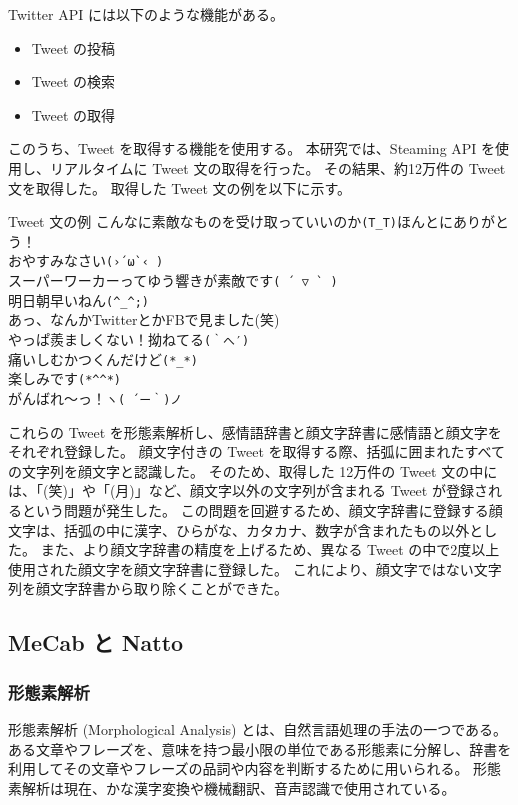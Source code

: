 \documentclass[11pt,a4j]{jsarticle}
\begin{document}
Twitter API には以下のような機能がある。

\begin{itemize}
  \item Tweet の投稿
  \item Tweet の検索
  \item Tweet の取得
\end{itemize}

このうち、Tweet を取得する機能を使用する。
本研究では、Steaming API を使用し、リアルタイムに Tweet 文の取得を行った。
その結果、約12万件の Tweet 文を取得した。
取得した Tweet 文の例を以下に示す。

\begin{itembox}[c]{Tweet 文の例}
  こんなに素敵なものを受け取っていいのか\verb|(T_T)|ほんとにありがとう！\\
  おやすみなさい\verb|(›´ω`‹ )| \\
  スーパーワーカーってゆう響きが素敵です\verb|( ´ ▽ ` )| \\
  明日朝早いねん\verb|(^_^;)| \\
  あっ、なんかTwitterとかFBで見ました(笑)\\
  やっぱ羨ましくない！拗ねてる\verb|(｀へ′)| \\
  痛いしむかつくんだけど\verb|(*_*)| \\
  楽しみです\verb|(*^^*)| \\
  がんばれ〜っ！\verb|ヽ( ´ー｀)ノ|\\
\end{itembox}

これらの Tweet を形態素解析し、感情語辞書と顔文字辞書に感情語と顔文字をそれぞれ登録した。
顔文字付きの Tweet を取得する際、括弧に囲まれたすべての文字列を顔文字と認識した。
そのため、取得した 12万件の Tweet 文の中には、「(笑)」や「(月)」など、顔文字以外の文字列が含まれる Tweet が登録されるという問題が発生した。
この問題を回避するため、顔文字辞書に登録する顔文字は、括弧の中に漢字、ひらがな、カタカナ、数字が含まれたもの以外とした。
また、より顔文字辞書の精度を上げるため、異なる Tweet の中で2度以上使用された顔文字を顔文字辞書に登録した。
これにより、顔文字ではない文字列を顔文字辞書から取り除くことができた。


\subsection{MeCab と Natto}
\subsubsection{形態素解析}
形態素解析 (Morphological Analysis) とは、自然言語処理の手法の一つである。
ある文章やフレーズを、意味を持つ最小限の単位である形態素に分解し、辞書を利用してその文章やフレーズの品詞や内容を判断するために用いられる。
形態素解析は現在、かな漢字変換や機械翻訳、音声認識で使用されている。
\end{document}

